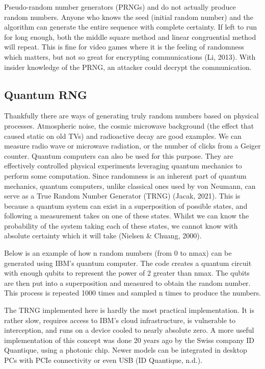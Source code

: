 Pseudo-random number generators (PRNGs) and do not actually produce random numbers. Anyone who knows the seed (initial random number) and the algorithm can generate the entire sequence with complete certainty. If left to run for long enough, both the middle square method and linear congruential method will repeat. This is fine for video games where it is the feeling of randomness which matters, but not so great for encrypting communications (Li, 2013). With insider knowledge of the PRNG, an attacker could decrypt the communication.

\subsection{Quantum RNG}

Thankfully there are ways of generating truly random numbers based on physical processes. Atmospheric noise, the cosmic microwave background (the effect that caused static on old TVs) and radioactive decay are good examples. We can measure radio wave or microwave radiation, or the number of clicks from a Geiger counter.
Quantum computers can also be used for this purpose. They are effectively controlled physical experiments leveraging quantum mechanics to perform some computation. Since randomness is an inherent part of quantum mechanics, quantum computers, unlike classical ones used by von Neumann, can serve as a True Random Number Generator (TRNG) (Jacak, 2021). This is because a quantum system can exist in a superposition of possible states, and following a measurement takes on one of these states. Whilst we can know the probability of the system taking each of these states, we cannot know with absolute certainty which it will take (Nielsen \& Chuang, 2000).

Below is an example of how n random numbers (from 0 to nmax) can be generated using IBM’s quantum computer. The code creates a quantum circuit with enough qubits to represent the power of 2 greater than nmax. The qubits are then put into a superposition and measured to obtain the random number. This process is repeated 1000 times and sampled n times to produce the numbers.  

The TRNG implemented here is hardly the most practical implementation. It is rather slow, requires access to IBM’s cloud infrastructure, is vulnerable to interception, and runs on a device cooled to nearly absolute zero. A more useful implementation of this concept was done 20 years ago by the Swiss company ID Quantique, using a photonic chip. Newer models can be integrated in desktop PCs with PCIe connectivity or even USB (ID Quantique, n.d.).


